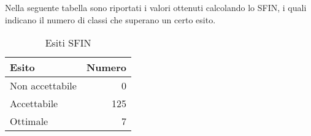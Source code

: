 Nella seguente tabella sono riportati i valori ottenuti calcolando lo SFIN, i quali indicano il numero di classi che superano un certo esito.
\begin{table}[h]
	\centering
	\begin{tabular}{l r}
		\hline
		\rule[-0.3cm]{0cm}{0.8cm}
		\textbf{Esito} & \textbf{Numero} \\
		\hline
		\rule[0cm]{0cm}{0.4cm}
		Non accettabile & 0 \\
		\rule[0cm]{0cm}{0.4cm}
		Accettabile & 125 \\
		\rule[0cm]{0cm}{0.4cm}
		Ottimale & 7 \\
		\hline
  \end{tabular}
	\caption{Esiti SFIN}
\end{table}